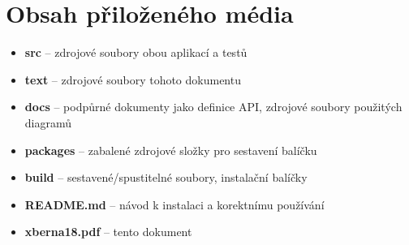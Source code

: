 \chapter{Obsah přiloženého média}

\begin{itemize}
    \item[] \textbf{src} – zdrojové soubory obou aplikací a testů
    \item[] \textbf{text} – zdrojové soubory tohoto dokumentu
    \item[] \textbf{docs} – podpůrné dokumenty jako definice API, zdrojové soubory použitých diagramů
    \item[] \textbf{packages} – zabalené zdrojové složky pro sestavení balíčku
    \item[] \textbf{build} – sestavené/spustitelné soubory, instalační balíčky
    \item[] \textbf{README.md} – návod k instalaci a korektnímu používání
    \item[] \textbf{xberna18.pdf} – tento dokument
\end{itemize}
